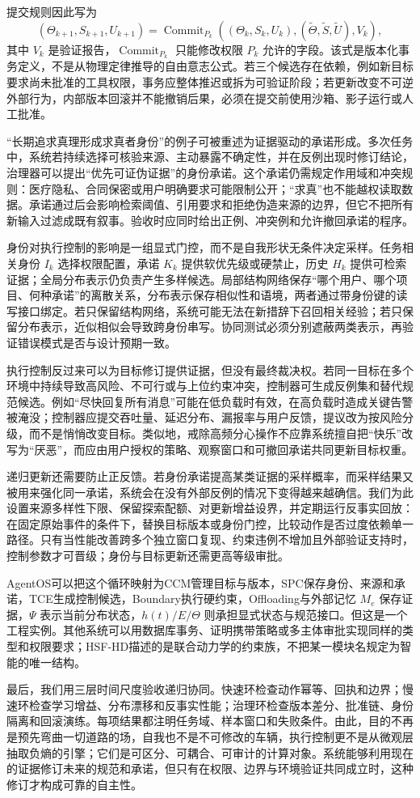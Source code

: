 提交规则因此写为
\[
(\Theta_{k+1},S_{k+1},U_{k+1})=
\operatorname{Commit}_{P_k}\!\left((\Theta_k,S_k,U_k),
(\widetilde\Theta,\widetilde S,\widetilde U),V_k\right),
\]
其中 $V_k$ 是验证报告，$\operatorname{Commit}_{P_k}$ 只能修改权限 $P_k$ 允许的字段。该式是版本化事务定义，不是从物理定律推导的自由意志公式。若三个候选存在依赖，例如新目标要求尚未批准的工具权限，事务应整体推迟或拆为可验证阶段；若更新改变不可逆外部行为，内部版本回滚并不能撤销后果，必须在提交前使用沙箱、影子运行或人工批准。

“长期追求真理形成求真者身份”的例子可被重述为证据驱动的承诺形成。多次任务中，系统若持续选择可核验来源、主动暴露不确定性，并在反例出现时修订结论，治理器可以提出“优先可证伪证据”的身份承诺。这个承诺仍需规定作用域和冲突规则：医疗隐私、合同保密或用户明确要求可能限制公开；“求真”也不能越权读取数据。承诺通过后会影响检索阈值、引用要求和拒绝伪造来源的边界，但它不把所有新输入过滤成既有叙事。验收时应同时给出正例、冲突例和允许撤回承诺的程序。

身份对执行控制的影响是一组显式门控，而不是自我形状无条件决定采样。任务相关身份 $I_k$ 选择权限配置，承诺 $K_k$ 提供软优先级或硬禁止，历史 $H_k$ 提供可检索证据；全局分布表示仍负责产生多样候选。局部结构网络保存“哪个用户、哪个项目、何种承诺”的离散关系，分布表示保存相似性和语境，两者通过带身份键的读写接口绑定。若只保留结构网络，系统可能无法在新措辞下召回相关经验；若只保留分布表示，近似相似会导致跨身份串写。协同测试必须分别遮蔽两类表示，再验证错误模式是否与设计预期一致。

执行控制反过来可以为目标修订提供证据，但没有最终裁决权。若同一目标在多个环境中持续导致高风险、不可行或与上位约束冲突，控制器可生成反例集和替代规范候选。例如“尽快回复所有消息”可能在低负载时有效，在高负载时造成关键告警被淹没；控制器应提交吞吐量、延迟分布、漏报率与用户反馈，提议改为按风险分级，而不是悄悄改变目标。类似地，戒除高频分心操作不应靠系统擅自把“快乐”改写为“厌恶”，而应由用户授权的策略、观察窗口和可撤回承诺共同更新目标权重。

递归更新还需要防止正反馈。若身份承诺提高某类证据的采样概率，而采样结果又被用来强化同一承诺，系统会在没有外部反例的情况下变得越来越确信。我们为此设置来源多样性下限、保留探索配额、对更新增益设界，并定期运行反事实回放：在固定原始事件的条件下，替换目标版本或身份门控，比较动作是否过度依赖单一路径。只有当性能改善跨多个独立窗口复现、约束违例不增加且外部验证支持时，控制参数才可晋级；身份与目标更新还需更高等级审批。

AgentOS可以把这个循环映射为CCM管理目标与版本，SPC保存身份、来源和承诺，TCE生成控制候选，Boundary执行硬约束，Offloading与外部记忆 $M_e$ 保存证据，$\Psi$ 表示当前分布状态，$h(t)/E/\Theta$ 则承担显式状态与规范接口。但这是一个工程实例。其他系统可以用数据库事务、证明携带策略或多主体审批实现同样的类型和权限要求；HSF-HD描述的是联合动力学的约束族，不把某一模块名规定为智能的唯一结构。

最后，我们用三层时间尺度验收递归协同。快速环检查动作幂等、回执和边界；慢速环检查学习增益、分布漂移和反事实性能；治理环检查版本差分、批准链、身份隔离和回滚演练。每项结果都注明任务域、样本窗口和失败条件。由此，目的不再是预先弯曲一切道路的场，自我也不是不可修改的车辆，执行控制更不是从微观层抽取负熵的引擎；它们是可区分、可耦合、可审计的计算对象。系统能够利用现在的证据修订未来的规范和承诺，但只有在权限、边界与环境验证共同成立时，这种修订才构成可靠的自主性。

